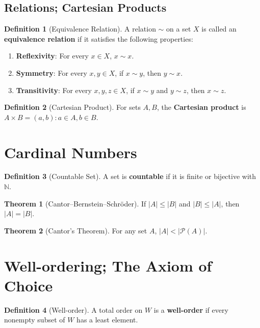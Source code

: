 \documentclass[12pt]{article}
\theoremstyle{definition} %
\newtheorem{theorem}{Theorem}
\newtheorem{definition}{Definition}
\theoremstyle{plain} %
\begin{document}
\subsection{Relations; Cartesian Products}
\begin{definition}[Equivalence Relation]
    A relation \(\sim\) on a set \(X\) is called an \textbf{equivalence relation} if it satisfies the following properties:
    \begin{enumerate}[label=(\roman*)]
        \item \textbf{Reflexivity}: For every \(x \in X\), \(x \sim x\).
        \item \textbf{Symmetry}: For every \(x,y \in X\), if \(x \sim y\), then \(y \sim x\).
        \item \textbf{Transitivity}: For every \(x,y,z \in X\), if \(x \sim y\) and \(y \sim z\), then \(x \sim z\).
    \end{enumerate}
    \end{definition}
\begin{definition}[Cartesian Product]
For sets \(A,B\), the \textbf{Cartesian product} is \(A \times B = {(a,b):a \in A,b \in B}\).
\end{definition}

\section{Cardinal Numbers}

\begin{definition}[Countable Set]
A set is \textbf{countable} if it is finite or bijective with \(\mathbb{N}\).
\end{definition}

\begin{theorem}[Cantor--Bernstein--Schröder]
If \(|A| \le |B|\) and \(|B| \le |A|\), then \(|A| = |B|\).
\end{theorem}

\begin{theorem}[Cantor's Theorem]
For any set \(A\), \(|A|<|\mathcal{P}(A)|\).
\end{theorem}

\section{Well-ordering; The Axiom of Choice}

\begin{definition}[Well-order]
A total order on \(W\) is a \textbf{well-order} if every nonempty subset of \(W\) has a least element.
\end{definition}
\end{document}
